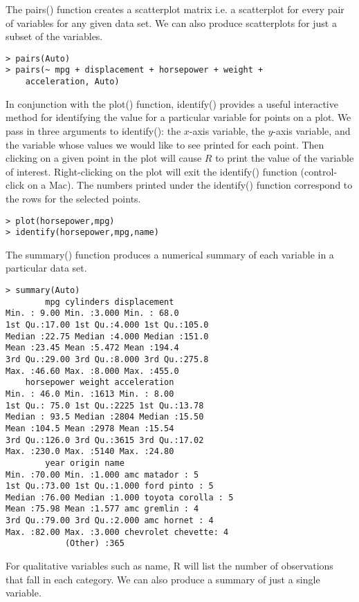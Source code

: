 \documentclass[10pt]{article}
\begin{document}
The pairs() function creates a scatterplot matrix i.e. a scatterplot for every pair of variables for any given data set. We can also produce scatterplots for just a subset of the variables.

\begin{verbatim}
> pairs(Auto)
> pairs(~ mpg + displacement + horsepower + weight +
    acceleration, Auto)
\end{verbatim}

In conjunction with the plot() function, identify() provides a useful interactive method for identifying the value for a particular variable for points on a plot. We pass in three arguments to identify(): the $x$-axis variable, the $y$-axis variable, and the variable whose values we would like to see printed for each point. Then clicking on a given point in the plot will cause $R$ to print the value of the variable of interest. Right-clicking on the plot will exit the identify() function (control-click on a Mac). The numbers printed under the identify() function correspond to the rows for the selected points.


\begin{verbatim}
> plot(horsepower,mpg)
> identify(horsepower,mpg,name)
\end{verbatim}

The summary() function produces a numerical summary of each variable in a particular data set.

\begin{verbatim}
> summary(Auto)
        mpg cylinders displacement
Min. : 9.00 Min. :3.000 Min. : 68.0
1st Qu.:17.00 1st Qu.:4.000 1st Qu.:105.0
Median :22.75 Median :4.000 Median :151.0
Mean :23.45 Mean :5.472 Mean :194.4
3rd Qu.:29.00 3rd Qu.:8.000 3rd Qu.:275.8
Max. :46.60 Max. :8.000 Max. :455.0
    horsepower weight acceleration
Min. : 46.0 Min. :1613 Min. : 8.00
1st Qu.: 75.0 1st Qu.:2225 1st Qu.:13.78
Median : 93.5 Median :2804 Median :15.50
Mean :104.5 Mean :2978 Mean :15.54
3rd Qu.:126.0 3rd Qu.:3615 3rd Qu.:17.02
Max. :230.0 Max. :5140 Max. :24.80
        year origin name
Min. :70.00 Min. :1.000 amc matador : 5
1st Qu.:73.00 1st Qu.:1.000 ford pinto : 5
Median :76.00 Median :1.000 toyota corolla : 5
Mean :75.98 Mean :1.577 amc gremlin : 4
3rd Qu.:79.00 3rd Qu.:2.000 amc hornet : 4
Max. :82.00 Max. :3.000 chevrolet chevette: 4
            (Other) :365
\end{verbatim}

For qualitative variables such as name, R will list the number of observations that fall in each category. We can also produce a summary of just a single variable.
\end{document}
